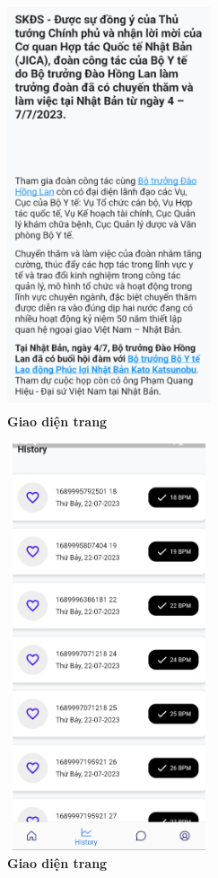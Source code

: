 \begin{figure}[H]
  \centering
  \includegraphics[width=6cm,height=12cm]{Images/mobile_app/demo/detail_news.png}
  \caption[Giao diện trang]{\bfseries \fontsize{12pt}{0pt}\selectfont Giao diện trang}
  \label{demo_} %
\end{figure}

\begin{figure}[H]
  \centering
  \includegraphics[width=6cm,height=12cm]{Images/mobile_app/demo/history.png}
  \caption[Giao diện trang]{\bfseries \fontsize{12pt}{0pt}\selectfont Giao diện trang}
  \label{demo_} %
\end{figure}

